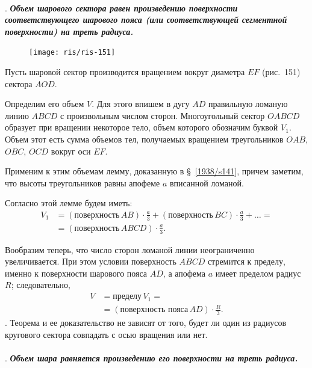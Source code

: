 \documentclass[twoside]{book}
\begin{document}
\paragraph{}\label{1938/s143}
.
\textbf{\emph{Объем шарового сектора равен произведению поверхности соответствующего шарового пояса (или соответствующей сегментной поверхности) на треть радиуса.}}

\begin{figure}[h!]
\centering
\texttt{[image: ris/ris-151]}
\caption{}
\end{figure}

Пусть шаровой сектор производится вращением вокруг диаметра $EF$ (рис.~151) сектора $AOD$.

Определим его объем $V$.
Для этого впишем в дугу $AD$ правильную ломаную линию $ABCD$ с произвольным числом сторон.
Многоугольный сектор $OABCD$ образует при вращении некоторое тело, объем которого обозначим буквой $V_1$.
Объем этот есть сумма объемов тел, получаемых вращением треугольников $OAB$, $OBC$, $OCD$ вокруг оси $EF$.

Применим к этим объемам лемму, доказанную в §~\ref{1938/s141}, причем заметим, что высоты треугольников равны апофеме $a$ вписанной ломаной.

Согласно этой лемме будем иметь:
\begin{align*}
V_1&=
(\text{поверхность}\, AB)\cdot\tfrac a3
+
(\text{поверхность}\, BC)\cdot\tfrac a3
+
\dots=
\\
&=
(\text{поверхность}\, ABCD)\cdot \tfrac a3.
\end{align*}

Вообразим теперь, что число сторон ломаной линии неограниченно увеличивается.
При этом условии поверхность $ABCD$ стремится к пределу, именно к поверхности шарового пояса $AD$, а апофема $a$ имеет пределом радиус $R$;
следовательно,
\begin{align*}
V&=\text{пределу}\, V_1=
\\
&=
(\text{поверхность пояса}\, AD)\cdot \frac R3.
\end{align*}
.
Теорема и ее доказательство не зависят от того, будет ли один из радиусов кругового сектора совпадать с осью вращения или нет.

\paragraph{}\label{1938/s144}
.
\textbf{\emph{Объем шара равняется произведению его поверхности на треть радиуса.}}
\end{document}
